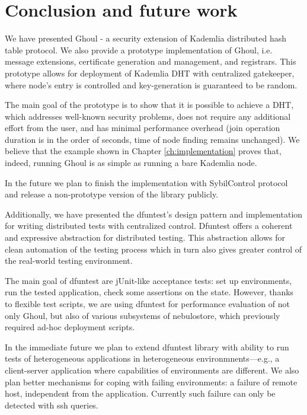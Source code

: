 \chapter{Conclusion and future work}
\label{ch:conclusion}
We have presented Ghoul - a security extension of Kademlia distributed hash
table protocol.
We also provide a prototype implementation of Ghoul, i.e. message extensions,
certificate generation and management, and registrars.
This prototype allows for deployment of Kademlia DHT with centralized
gatekeeper, where node's entry is controlled and key-generation is guaranteed to
be random.

The main goal of the prototype is to show that it is possible to achieve a
DHT, which addresses well-known security problems, does not require
any additional effort from the user, and has minimal performance overhead (join
operation duration is in the order of seconds, time of node finding remains
unchanged).
We believe that the example shown in Chapter \ref{ch:implementation} proves
that, indeed, running Ghoul is as simple as running a bare Kademlia node.

In the future we plan to finish the implementation with SybilControl protocol
and release a non-prototype version of the library publicly.

Additionally, we have presented the dfuntest's design pattern and implementation
for writing distributed tests with centralized control.
Dfuntest offers a coherent and expressive abstraction for distributed testing.
This abstraction allows for clean automation of the testing process which in
turn also gives greater control of the real-world testing environment.

The main goal of dfuntest are jUnit-like acceptance tests: set up environments,
run the tested application, check some assertions on the state. 
However, thanks to flexible test scripts, we are using dfuntest
for performance evaluation of not only Ghoul, but also of various subsystems of
nebulostore, which previously required ad-hoc deployment scripts.

In the immediate future we plan to extend dfuntest library with ability to run
tests of heterogeneous applications in heterogeneous environmnents---e.g., a
client-server application where capabilities of environments are different.
We also plan better mechanisms for coping with failing environments: a failure
of remote host, independent from the application. Currently such failure can
only be detected with ssh queries.
